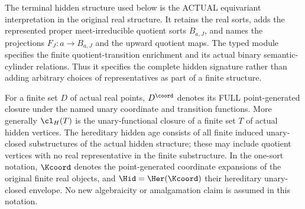 The terminal hidden structure used below is the ACTUAL equivariant
interpretation in the original real structure. It retains the real sorts,
adds the represented proper meet-irreducible quotient sorts $B_{a,J}$,
and names the projections $F_J:a\to B_{a,J}$ and the upward quotient maps.
The typed module specifies the finite quotient-transition enrichment and
its actual binary semantic-cylinder relations. Thus it specifies the
complete hidden signature rather than adding arbitrary choices of
representatives as part of a finite structure.

For a finite set $D$ of actual real points, $D^{\coord}$ denotes its FULL
point-generated closure under the named unary coordinate and transition
functions. More generally $\cl_H(T)$ is the unary-functional closure of a
finite set $T$ of actual hidden vertices. The hereditary hidden age consists
of all finite induced unary-closed substructures of the actual hidden
structure; these may include quotient vertices with no real representative
in the finite substructure. In the one-sort notation, $\Kcoord$ denotes the
point-generated coordinate expansions of the original finite real objects,
and $\Hid=\Her(\Kcoord)$ their hereditary unary-closed envelope. No new
algebraicity or amalgamation claim is assumed in this notation.
